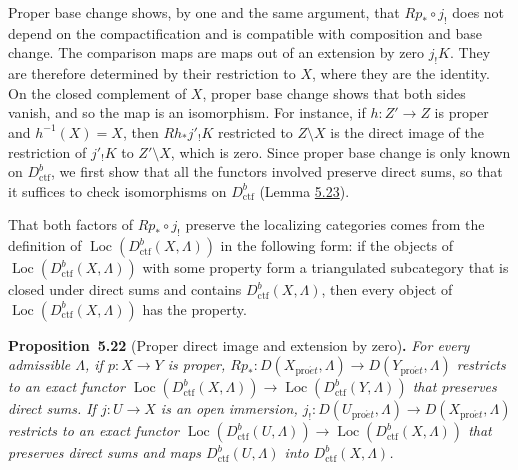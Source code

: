\documentclass[11pt]{article}
\newenvironment{bpstatement}[2]{\par\addvspace{0.6\baselineskip}\noindent\textbf{#1}#2\textbf{.}\enspace\ignorespaces}
  {\par\addvspace{0.4\baselineskip}}
\newenvironment{bpstatementit}[2]{\begin{bpstatement}{#1}{#2}\itshape\ignorespaces}{\end{bpstatement}}
\providecommand{\Loc}{}\renewcommand{\Loc}{\operatorname{Loc}}
\begin{document}
Proper base change shows, by one and the same argument, that \(Rp_*\circ j_!\) does not depend on the compactification and is compatible with composition and base change. The comparison maps are maps out of an extension by zero \(j_!K\). They are therefore determined by their restriction to \(X\), where they are the identity. On the closed complement of \(X\), proper base change shows that both sides vanish, and so the map is an isomorphism. For instance, if \(h:Z'\to Z\) is proper and \(h^{-1}(X)=X\), then \(Rh_*j'_!K\) restricted to \(Z\setminus X\) is the direct image of the restriction of \(j'_!K\) to \(Z'\setminus X\), which is zero. Since proper base change is only known on \(D^b_{\mathrm{ctf}}\), we first show that all the functors involved preserve direct sums, so that it suffices to check isomorphisms on \(D^b_{\mathrm{ctf}}\) (Lemma \hyperref[bp79]{5.23}).

That both factors of \(Rp_*\circ j_!\) preserve the localizing categories comes from the definition of \(\Loc(D^b_{\mathrm{ctf}}(X,\Lambda))\) in the following form: if the objects of \(\Loc(D^b_{\mathrm{ctf}}(X,\Lambda))\) with some property form a triangulated subcategory that is closed under direct sums and contains \(D^b_{\mathrm{ctf}}(X,\Lambda)\), then every object of \(\Loc(D^b_{\mathrm{ctf}}(X,\Lambda))\) has the property.

\label{bp76}%
\begin{bpstatementit}{Proposition~5.22}{ (Proper direct image and extension by zero)}
For every admissible \(\Lambda\), if \(p:X\to Y\) is proper, \(Rp_*:D(X_{\mathrm{pro}\acute{e}t},\Lambda)\to D(Y_{\mathrm{pro}\acute{e}t},\Lambda)\) restricts to an exact functor \(\Loc(D^b_{\mathrm{ctf}}(X,\Lambda))\to\Loc(D^b_{\mathrm{ctf}}(Y,\Lambda))\) that preserves direct sums. If \(j:U\to X\) is an open immersion, \(j_!:D(U_{\mathrm{pro}\acute{e}t},\Lambda)\to D(X_{\mathrm{pro}\acute{e}t},\Lambda)\) restricts to an exact functor \(\Loc(D^b_{\mathrm{ctf}}(U,\Lambda))\to\Loc(D^b_{\mathrm{ctf}}(X,\Lambda))\) that preserves direct sums and maps \(D^b_{\mathrm{ctf}}(U,\Lambda)\) into \(D^b_{\mathrm{ctf}}(X,\Lambda)\).
\end{bpstatementit}
\end{document}
